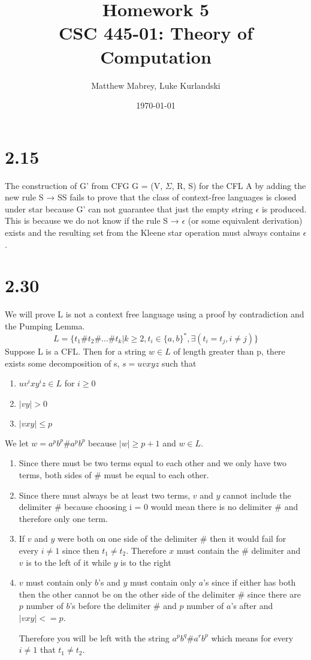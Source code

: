 \documentclass{article}
\title{Homework 5\\[0.2em]\smaller{}CSC 445-01: Theory of Computation}
\author{Matthew Mabrey, Luke Kurlandski}
\date{\today}
\begin{document}
\maketitle

\section*{2.15}
The construction of G' from CFG G = (V, $\Sigma$, R, S) for the CFL A by adding the new rule S → SS fails to prove that the class of context-free languages is closed under star because G' can not guarantee that just the empty string $\epsilon$ is produced. This is because we do not know if the rule S → $\epsilon$ (or some equivalent derivation) exists  and the resulting set from the Kleene star operation must always contains $\epsilon$. 

\section*{2.30}

We will prove L is not a context free language using a proof by contradiction and the Pumping Lemma.
$$L = \{ t_1\#t_2\#...\#t_k | k \geq 2, t_i \in \{ a, b\}^*, \exists ( t_i = t_j,  i \neq j ) \}$$
Suppose L is a CFL. Then for a string $w \in L$ of length greater than p, there exists some decomposition of s, $s = uvxyz$ such that 
\begin{enumerate}
    \item $uv^ixy^iz \in L$ for $i \geq 0$
    \item $|vy| > 0$
    \item $|vxy| \leq p$
\end{enumerate}

We let $w = a^pb^p\#a^pb^p$ because $|w| \geq p + 1$ and $w \in L$.

\begin{enumerate}
    \item Since there must be two terms equal to each other and we only have two terms, both sides of $\#$ must be equal to each other.
    \item Since there must always be at least two terms, $v$ and $y$ cannot include the delimiter $\#$ because choosing i = 0 would mean there is no delimiter $\#$ and therefore only one term.
    \item If $v$ and $y$ were both on one side of the delimiter $\#$ then it would fail for every $i \neq 1$ since then $t_1 \neq t_2$. Therefore $x$ must contain the $\#$ delimiter and $v$ is to the left of it while $y$ is to the right
    \item $v$ must contain only $b$'s and $y$ must contain only $a$'s since if either has both then the other cannot be on the other side of the delimiter $\#$ since there are $p$ number of $b$'s before the delimiter $\#$ and $p$ number of $a$'s after and $|vxy| <= p$.
    
    Therefore you will be left with the string $a^p b^q \# a^r b^p$ which means for every $i \neq 1$ that $t_1 \neq t_2$.
\end{enumerate}
\end{document}
